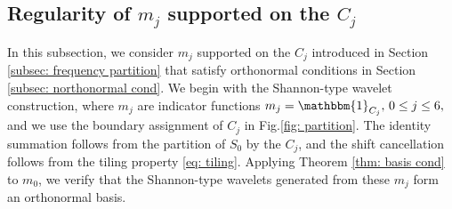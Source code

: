 \subsection{Regularity of $m_j$ supported on the $C_j$}\label{sec: design}

In this subsection, we consider $m_j$ supported on the $C_j$ introduced in Section \ref{subsec: frequency partition} that satisfy orthonormal conditions in Section \ref{subsec: northonormal cond}. We begin with the Shannon-type wavelet construction,
where $m_j$ are indicator functions $ m_j = \mathbbm{1}_{C_j},\,0\leq j \leq 6,\,$ and we use the boundary assignment of $C_j$ in Fig.\ref{fig: partition}.
The identity summation follows from the partition of $S_0$ by the $C_j$, and the shift cancellation follows from the tiling property \eqref{eq: tiling}. %
Applying Theorem \ref{thm: basis cond} to $m_0$, we verify that the Shannon-type wavelets generated from these $m_j$ form an orthonormal basis.

